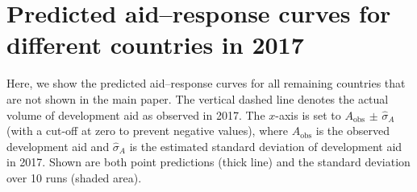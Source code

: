 \documentclass[sigconf]{acmart}
\newcommand{\framework}{\textbf{\mbox{CG-CT}}\xspace}
\begin{document}


\newpage

\section{Predicted aid--response curves for different countries in 2017}
\label{supp:country_plots} %

Here, we show the predicted aid--response curves for all remaining countries that are not shown in the main paper. The vertical dashed line denotes the actual volume of development aid as observed in 2017. The $x$-axis is set to $A_\text{obs}$ $\pm$ $\hat{\sigma}_{A}$ (with a cut-off at zero to prevent negative values), where $A_\text{obs}$ is the observed development aid and $\hat{\sigma}_{A}$ is the estimated standard deviation of development aid in 2017. Shown are both point predictions (thick line) and the standard deviation over 10 runs (shaded area).
\end{document}
